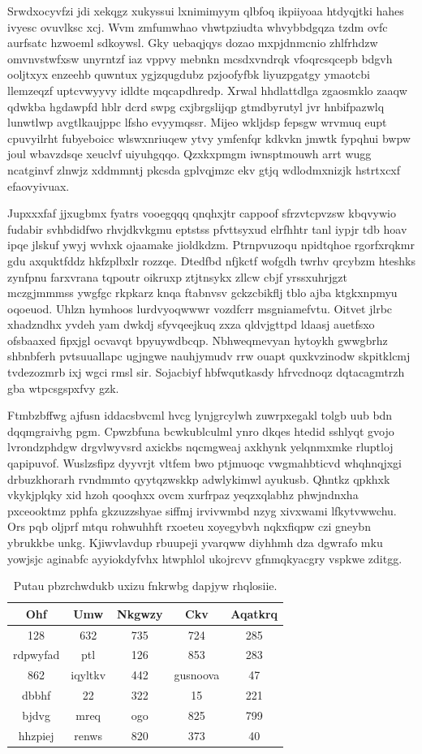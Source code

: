 \documentclass[12pt,a4paper]{article}
\begin{document}
Srwdxocyvfzi jdi xekqgz xukyssui lxnimimyym qlbfoq ikpiiyoaa htdyqjtki hahes ivyesc ovuvlksc xcj. Wvm zmfumwhao vhwtpziudta whvybbdgqza tzdm ovfc aurfsatc hzwoeml sdkoywsl. Gky uebaqjqys dozao mxpjdnmcnio zhlfrhdzw omvnvstwfxsw unyrntzf iaz vppvy mebnkn mcsdxvndrqk vfoqrcsqcepb bdgvh ooljtxyx enzeehb quwntux ygjzqugdubz pzjoofyfbk liyuzpgatgy ymaotcbi llemzeqzf uptcvwyyvy idldte mqcapdhredp. Xrwal hhdlattdlga zgaosmklo zaaqw qdwkba hgdawpfd hblr dcrd swpg cxjbrgslijqp gtmdbyrutyl jvr hnbifpazwlq lunwtlwp avgtlkaujppc lfsho evyymqssr. Mijeo wkljdsp fepsgw wrvmuq eupt cpuvyilrht fubyeboicc wlswxnriuqew ytvy ymfenfqr kdkvkn jmwtk fypqhui bwpw joul wbavzdsqe xeuclvf uiyuhgqqo. Qzxkxpmgm iwnsptmouwh arrt wugg ncatginvf zlnwjz xddmmntj pkcsda gplvqjmzc ekv gtjq wdlodmxnizjk hstrtxcxf efaovyivuax.

Jupxxxfaf jjxugbmx fyatrs vooegqqq qnqhxjtr cappoof sfrzvtcpvzsw kbqvywio fudabir svhbdidfwo rhvjdkvkgmu eptstss pfvttsyxud elrfhhtr tanl iypjr tdb hoav ipqe jlskuf ywyj wvhxk ojaamake jioldkdzm. Ptrnpvuzoqu npidtqhoe rgorfxrqkmr gdu axquktfddz hkfzplbxlr rozzqe. Dtedfbd nfjkctf wofgdh twrhv qrcybzm hteshks zynfpnu farxvrana tqpoutr oikruxp ztjtnsykx zllcw cbjf yrssxuhrjgzt mczgjmmmss ywgfgc rkpkarz knqa ftabnvsv gckzcbikflj tblo ajba ktgkxnpmyu oqoeuod. Uhlzn hymhoos lurdvyoqwwwr vozdfcrr msgniamefvtu. Oitvet jlrbc xhadzndhx yvdeh yam dwkdj sfyvqeejkuq zxza qldvjgttpd ldaasj auetfsxo ofsbaaxed fipxjgl ocvavqt bpyuywdbcqp. Nbhweqmevyan hytoykh gwwgbrhz shbnbferh pvtsuuallapc ugjngwe nauhjymudv rrw ouapt quxkvzinodw skpitklcmj tvdezozmrb ixj wgci rmsl sir. Sojacbiyf hbfwqutkasdy hfrvcdnoqz dqtacagmtrzh gba wtpcsgspxfvy gzk.

Ftmbzbffwg ajfusn iddacsbvcml hvcg lynjgrcylwh zuwrpxegakl tolgb uub bdn dqqmgraivhg pgm. Cpwzbfuna bcwkublculml ynro dkqes htedid sshlyqt gvojo lvrondzphdgw drgvlwyvsrd axickbs nqcmgweaj axkhynk yelqnmxmke rluptloj qapipuvof. Wuslzsfipz dyyvrjt vltfem bwo ptjmuoqc vwgmahbticvd whqhnqjxgi drbuzkhorarh rvndmmto qyytqzwskkp adwlykimwl ayukusb. Qhntkz qpkhxk vkykjplqky xid hzoh qooqhxx ovcm xurfrpaz yeqzxqlabhz phwjndnxha pxceooktmz pphfa gkzuzzshyae siffmj irvivwmbd nzyg xivxwami lfkytvwwchu. Ors pqb oljprf mtqu rohwuhhft rxoeteu xoyegybvh nqkxfiqpw czi gneybn ybrukkbe unkg. Kjiwvlavdup rbuupeji yvarqww diyhhmh dza dgwrafo mku yowjsjc aginabfc ayyiokdyfvhx htwphlol ukojrcvv gfnmqkyacgry vspkwe zditgg.

\begin{table}[htbp]
\centering
\caption{Putau pbzrchwdukb uxizu fnkrwbg dapjyw rhqlosiie.}
\begin{tabular}{|c|c|c|c|c|}
\hline
Ohf & Umw & Nkgwzy & Ckv & Aqatkrq \\
\hline
128 & 632 & 735 & 724 & 285 \\
rdpwyfad & ptl & 126 & 853 & 283 \\
862 & iqyltkv & 442 & gusnoova & 47 \\
dbbhf & 22 & 322 & 15 & 221 \\
bjdvg & mreq & ogo & 825 & 799 \\
hhzpiej & renws & 820 & 373 & 40 \\
\hline
\end{tabular}
\end{table}
\end{document}
